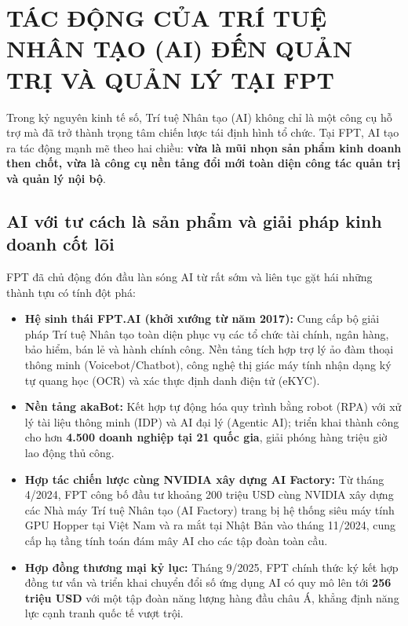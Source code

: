 \section{TÁC ĐỘNG CỦA TRÍ TUỆ NHÂN TẠO (AI) ĐẾN QUẢN TRỊ VÀ QUẢN LÝ TẠI FPT}

Trong kỷ nguyên kinh tế số, Trí tuệ Nhân tạo (AI) không chỉ là một công cụ hỗ trợ mà đã trở thành trọng tâm chiến lược tái định hình tổ chức. Tại FPT, AI tạo ra tác động mạnh mẽ theo hai chiều: \textbf{vừa là mũi nhọn sản phẩm kinh doanh then chốt, vừa là công cụ nền tảng đổi mới toàn diện công tác quản trị và quản lý nội bộ}.

\subsection{AI với tư cách là sản phẩm và giải pháp kinh doanh cốt lõi}
FPT đã chủ động đón đầu làn sóng AI từ rất sớm và liên tục gặt hái những thành tựu có tính đột phá:
\begin{itemize}
    \item \textbf{Hệ sinh thái FPT.AI (khởi xướng từ năm 2017):} Cung cấp bộ giải pháp Trí tuệ Nhân tạo toàn diện phục vụ các tổ chức tài chính, ngân hàng, bảo hiểm, bán lẻ và hành chính công. Nền tảng tích hợp trợ lý ảo đàm thoại thông minh (Voicebot/Chatbot), công nghệ thị giác máy tính nhận dạng ký tự quang học (OCR) và xác thực định danh điện tử (eKYC).
    \item \textbf{Nền tảng akaBot:} Kết hợp tự động hóa quy trình bằng robot (RPA) với xử lý tài liệu thông minh (IDP) và AI đại lý (Agentic AI); triển khai thành công cho hơn \textbf{4.500 doanh nghiệp tại 21 quốc gia}, giải phóng hàng triệu giờ lao động thủ công.
    \item \textbf{Hợp tác chiến lược cùng NVIDIA xây dựng AI Factory:} Từ tháng 4/2024, FPT công bố đầu tư khoảng 200 triệu USD cùng NVIDIA xây dựng các Nhà máy Trí tuệ Nhân tạo (AI Factory) trang bị hệ thống siêu máy tính GPU Hopper tại Việt Nam và ra mắt tại Nhật Bản vào tháng 11/2024, cung cấp hạ tầng tính toán đám mây AI cho các tập đoàn toàn cầu.
    \item \textbf{Hợp đồng thương mại kỷ lục:} Tháng 9/2025, FPT chính thức ký kết hợp đồng tư vấn và triển khai chuyển đổi số ứng dụng AI có quy mô lên tới \textbf{256 triệu USD} với một tập đoàn năng lượng hàng đầu châu Á, khẳng định năng lực cạnh tranh quốc tế vượt trội.
\end{itemize}

